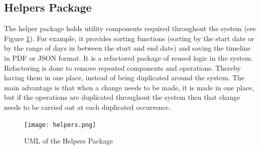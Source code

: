 \subsection{Helpers Package}
\par The helper package holds utility components required throughout the system (see Figure \ref{fig:helpers}). For example, it provides sorting functions (sorting by the start date or by the range of days in between the start and end date) and saving the timeline in PDF or JSON format. It is a refactored package of reused logic in the system. Refactoring is done to remove repeated components and operations. Thereby having them in one place, instead of being duplicated around the system. The main advantage is that when a change needs to be made, it is made in one place, but if the operations are duplicated throughout the system then that change needs to be carried out at each duplicated occurrence.
\begin{figure}[H]
\caption{UML of the Helpers Package}
\label{fig:helpers}
\texttt{[image: helpers.png]}
\centering
\end{figure}

